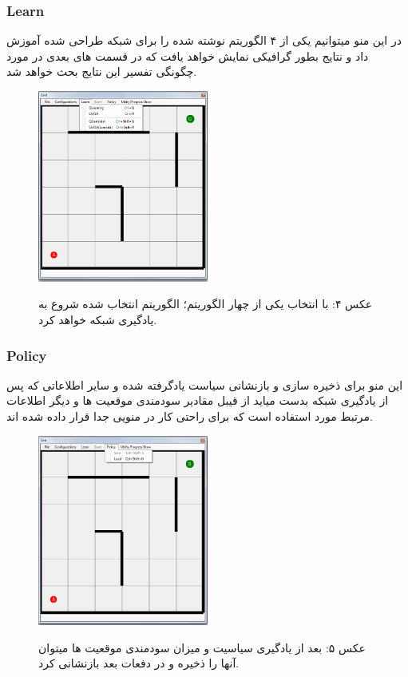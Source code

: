 \documentclass[10pt,a4paper]{article}
\begin{document}
\begin{Arabic}
    \subsubsection{Learn}
  در این منو میتوانیم یکی از ۴ الگوریتم نوشته شده را برای شبکه طراحی شده آموزش داد و نتایج بطور گرافیکی نمایش خواهد یافت که در قسمت های بعدی در مورد چگونگی تفسیر این نتایج بحث خواهد شد.
\begin{figure}[H]
    \centering
    \includegraphics[width=0.5\textwidth]{learn-menu}
    \begin{center}
    \textarabic{عکس ۴: با انتخاب یکی از چهار الگوریتم؛ الگوریتم انتخاب شده شروع به یادگیری شبکه خواهد کرد.}
    \end{center}
\end{figure}
    \subsubsection{Policy}
    این منو برای ذخیره سازی و بازنشانی سیاست یادگرفته شده و سایر اطلاعاتی که پس از یادگیری شبکه بدست میاید از قیبل مقادیر سودمندی موقعیت ها و دیگر اطلاعات مرتبط مورد استفاده است که برای راحتی کار در منویی جدا قرار داده شده اند.
\begin{figure}[H]
    \centering
    \includegraphics[width=0.5\textwidth]{policy-menu}
    \begin{center}
    \textarabic{عکس ۵: بعد از یادگیری سیاسیت و میزان سودمندی موقعیت ها میتوان آنها را ذخیره و در دفعات بعد بازنشانی کرد.}
    \end{center}
\end{figure}

\end{Arabic}
\end{document}
